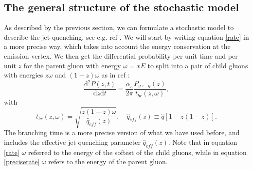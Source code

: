 \documentclass[a4paper,12pt]{article}
\numberwithin{equation}{section}
\begin{document}

\subsection{The general structure of the stochastic model}

As described by the previous section, we can formulate a stochastic model to describe the jet quenching, see e.g. ref \cite{probabilistic}. We will start by writing equation \eqref{rate} in a more precise way, which takes into account the energy conservation at the emission vertex. We then get the differential probability per unit time and per unit $z$ for the parent gluon with energy $\omega = xE$ to split into a pair of child gluons with energies $z\omega$ and $(1-z)\omega$ as in ref \cite{FisterIancu}:
\begin{equation}\label{preciserate}
\frac{\mathrm{d}^2 P(z,t)}{\mathrm{d}z\mathrm{d}t}=\frac{\alpha_s}{2 \pi}\frac{P_{g\leftarrow g}(z)}{t_{br}(z,\omega)},
\end{equation}
with
\begin{equation}
t_{br}(z,\omega)=\sqrt{\frac{z(1-z)\omega}{\hat{q}_{eff}(z)}}, \quad \hat{q}_{eff}(z) \equiv \hat{q}[1-z(1-z)].
\end{equation}
The branching time is a more precise version of what we have used before, and includes the effective jet quenching parameter $\hat{q}_{eff}(z)$. Note that in equation \eqref{rate} $\omega$ referred to the energy of the softest of the child gluons, while in equation \eqref{preciserate} $\omega$ refers to the energy of the parent gluon.
\end{document}

